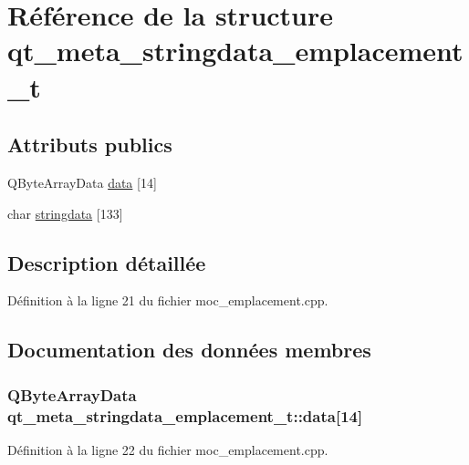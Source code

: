 \hypertarget{structqt__meta__stringdata__emplacement__t}{\section{Référence de la structure qt\-\_\-meta\-\_\-stringdata\-\_\-emplacement\-\_\-t}
\label{structqt__meta__stringdata__emplacement__t}
}
\subsection*{Attributs publics}
\begin{DoxyCompactItemize}
\item 
Q\-Byte\-Array\-Data \hyperlink{structqt__meta__stringdata__emplacement__t_a53da49e21c19bc064be31890040f6560}{data} \mbox{[}14\mbox{]}
\item 
char \hyperlink{structqt__meta__stringdata__emplacement__t_af14932ea4cfac05db872ab1e88cc304b}{stringdata} \mbox{[}133\mbox{]}
\end{DoxyCompactItemize}


\subsection{Description détaillée}


Définition à la ligne 21 du fichier moc\-\_\-emplacement.\-cpp.



\subsection{Documentation des données membres}
\hypertarget{structqt__meta__stringdata__emplacement__t_a53da49e21c19bc064be31890040f6560}{
\subsubsection[{data}]{\setlength{\rightskip}{0pt plus 5cm}Q\-Byte\-Array\-Data qt\-\_\-meta\-\_\-stringdata\-\_\-emplacement\-\_\-t\-::data\mbox{[}14\mbox{]}}}\label{structqt__meta__stringdata__emplacement__t_a53da49e21c19bc064be31890040f6560}


Définition à la ligne 22 du fichier moc\-\_\-emplacement.\-cpp.

